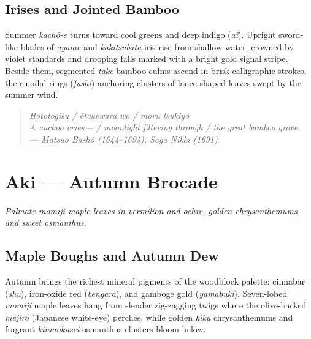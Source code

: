 \documentclass[10pt,a5paper,twoside,openany]{report}
\begin{document}
\section*{Irises and Jointed Bamboo}

Summer \emph{kach\=o-e} turns toward cool greens and deep indigo (\emph{ai}). Upright sword-like blades of \emph{ayame} and \emph{kakitsubata} iris rise from shallow water, crowned by violet standards and drooping falls marked with a bright gold signal stripe. Beside them, segmented \emph{take} bamboo culms ascend in brisk calligraphic strokes, their nodal rings (\emph{fushi}) anchoring clusters of lance-shaped leaves swept by the summer wind.

\begin{quote}
\itshape
Hototogisu / \=otakewara wo / moru tsukiyo\\[2pt]
A cuckoo cries--- / moonlight filtering through / the great bamboo grove.\\[2pt]
\upshape\footnotesize --- Matsuo Bash\=o (1644--1694), \emph{Saga Nikki} (1691)
\end{quote}

\clearpage

\chapter*{Aki --- Autumn Brocade}
\vspace{2mm}
\noindent\emph{Palmate momiji maple leaves in vermilion and ochre, golden chrysanthemums, and sweet osmanthus.}
\clearpage

\section*{Maple Boughs and Autumn Dew}

Autumn brings the richest mineral pigments of the woodblock palette: cinnabar (\emph{shu}), iron-oxide red (\emph{bengara}), and gamboge gold (\emph{yamabuki}). Seven-lobed \emph{momiji} maple leaves hang from slender zig-zagging twigs where the olive-backed \emph{mejiro} (Japanese white-eye) perches, while golden \emph{kiku} chrysanthemums and fragrant \emph{kinmokusei} osmanthus clusters bloom below.
\end{document}

